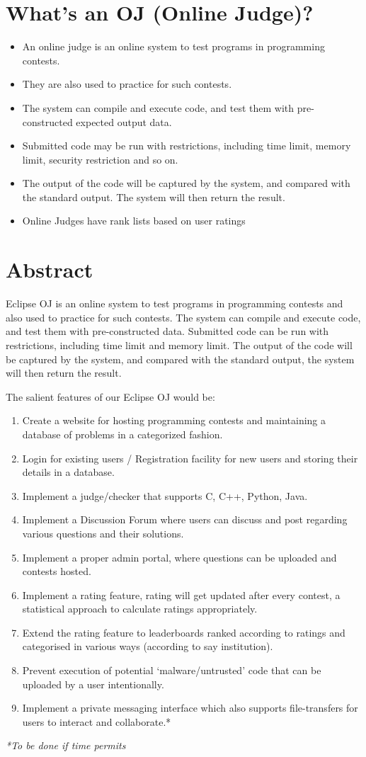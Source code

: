 \documentclass[hidelinks, a4paper,12pt, titlepage]{article}
\begin{document}
\section{What's an OJ (Online Judge)?}
\begin{itemize}
\item An online judge is an online system to test programs in programming contests.
\item They are also used to practice for such contests.
\item The system can compile and execute code, and test them with pre-constructed expected output data.
\item Submitted code may be run with restrictions, including time limit, memory limit, security restriction and so on.
\item The output of the code will be captured by the system, and compared with the standard output. The system will then return the result.
\item Online Judges have rank lists based on user ratings
\end{itemize}
\section{Abstract}
Eclipse OJ is an online system to test programs in programming contests and also used to practice for such contests. The system can compile and execute code, and test them with pre-constructed data. Submitted code can be run with restrictions, including time limit and memory limit. The output of the code will be captured by the system, and compared with the standard output, the system will then return the result.

The salient features of our Eclipse OJ would be:
\begin{enumerate}
\item Create a website for hosting programming contests and maintaining a database of problems in a categorized fashion.
\item Login for existing users / Registration facility for new users and storing their details in a database.
\item Implement a judge/checker that supports C, C++, Python, Java.
\item Implement a Discussion Forum where users can discuss and post regarding various questions and their solutions.
\item Implement a proper admin portal, where questions can be uploaded and contests hosted. 
\item Implement a rating feature, rating will get updated after every contest, a statistical approach to calculate ratings appropriately.
\item Extend the rating feature to leaderboards ranked according to ratings and categorised in various ways (according to say institution).
\item Prevent execution of potential `malware/untrusted' code that can be uploaded by a user intentionally.
\item Implement a private messaging interface which also supports file-transfers for users to interact and collaborate.*
\end{enumerate}
\hfill\textit{*To be done if time permits}
\end{document}
